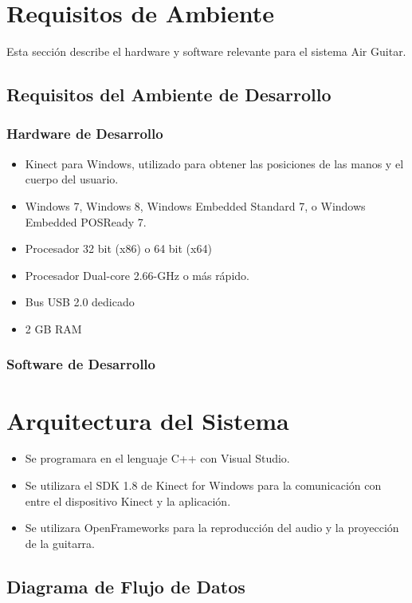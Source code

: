 \documentclass[a4paper,12pt]{article}
\begin{document}
\section{Requisitos de Ambiente}
Esta sección describe el hardware y software relevante para el sistema Air
Guitar.
\subsection{Requisitos del Ambiente de Desarrollo}
\subsubsection{Hardware de Desarrollo}

\begin{itemize}
	\item Kinect para Windows, utilizado para obtener las posiciones de las manos y el cuerpo del usuario.
    \item Windows 7, Windows 8, Windows Embedded Standard 7, o Windows Embedded POSReady 7.
    \item Procesador 32 bit (x86) o 64 bit (x64) 
    \item Procesador Dual-core 2.66-GHz o más rápido. 
    \item Bus USB 2.0 dedicado
    \item 2 GB RAM
\end{itemize}

\subsubsection{Software de Desarrollo}

\section{Arquitectura del Sistema}

\begin{itemize}
	\item Se programara en el lenguaje C++ con Visual Studio.
	\item Se utilizara el SDK 1.8 de Kinect for Windows para la comunicación con entre el dispositivo Kinect y la aplicación. 
	\item Se utilizara OpenFrameworks para la reproducción del audio y la proyección de la guitarra.
\end{itemize}

\subsection{Diagrama de Flujo de Datos}
\end{document}
